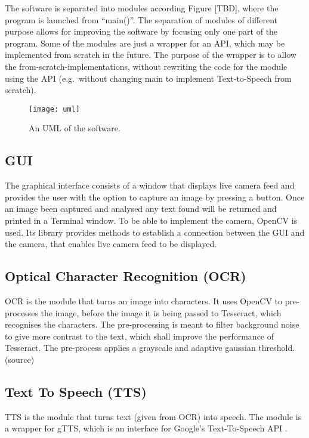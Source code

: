 \documentclass[../main.tex]{subfiles}
\begin{document}
The software is separated into modules according Figure [TBD], where the
program is launched from ``main()''. The separation of modules of different
purpose allows for improving the software by focusing only one part of the
program. Some of the modules are just a wrapper for an API, which may be
implemented from scratch in the future. The purpose of the wrapper is to allow
the from-scratch-implementations, without rewriting the code for the module
using the API (e.g.\ without changing main to implement Text-to-Speech from
scratch).

\begin{figure}[ht!]
  \centering
  \caption{An UML of the software.\label{fig:uml}}
  \texttt{[image: uml]}
\end{figure}

\subsection{GUI}
The graphical interface consists of a window that displays live camera feed and provides the user with the option to capture an image by pressing a button. Once an image been captured and analysed any text found will be returned and printed in a Terminal window. To be able to implement the camera, OpenCV is used. Its library provides methods to establish a connection between the GUI and the camera, that enables live camera feed to be displayed.

\subsection{Optical Character Recognition (OCR)}

OCR is the module that turns an image into characters. It uses OpenCV to pre-processes the image, before the image it is being passed to Tesseract, which recognises the characters. The pre-processing is meant to filter background noise to give more contrast to the text, which shall improve the performance of Tesseract. The pre-process applies a grayscale and adaptive gaussian threshold. (source) %

\subsection{Text To Speech (TTS)}

TTS is the module that turns text (given from OCR) into speech. The module is a wrapper for gTTS, which is an interface for Google’s Text-To-Speech API \cite{github_gTTS}.
\end{document}
